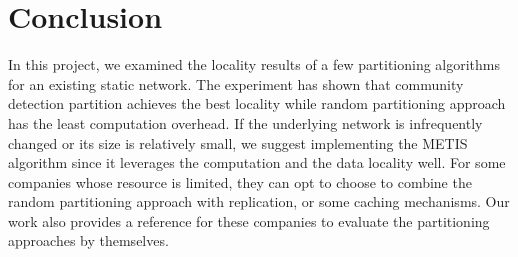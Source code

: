 \section{Conclusion}

In this project, we examined the locality results of a few partitioning algorithms for an existing static network. The experiment has shown that community detection partition achieves the best locality while random partitioning approach has the least computation overhead. If the underlying network is infrequently changed or its size is relatively small, we suggest implementing the METIS algorithm since it leverages the computation and the data locality well. For some companies whose resource is limited, they can opt to choose to combine the random partitioning approach with replication, or some caching mechanisms. Our work also provides a reference for these companies to evaluate the partitioning approaches by themselves.